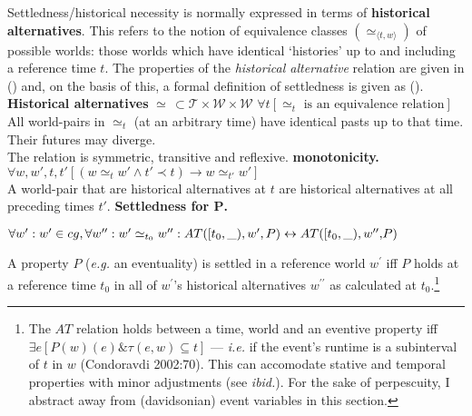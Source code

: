 \documentclass[11pt]{article}
\begin{document}
Settledness/historical necessity is normally expressed in terms of \textbf{historical alternatives}. This refers to the notion of equivalence classes $(\simeq_{\langle t,w\rangle})$ of possible worlds: those worlds which have identical `histories' up to and including a reference time $t$. The properties of the \textit{historical alternative} relation are given in (\nextx) and, on the basis of this, a formal definition of settledness is given as (\anextx).
\pex \textbf{Historical alternatives} $\boldsymbol\simeq\,\subset\mathcal{T\times W\times W}$
\a $\forall t[\simeq_t\text{ is an equivalence relation}]$\\
All world-pairs in $\simeq_t$ (at an arbitrary time) have identical pasts up to that time.\\Their futures may diverge.\\
The relation is symmetric, transitive and reflexive.
\a \textbf{monotonicity.} $ \forall w,w',t,t'[(w\simeq_t w'\wedge t'\prec t)\to w\simeq_{t'} w']$\\
A world-pair that are historical alternatives at $t$ are historical alternatives at all preceding times $t'$.
\xe
\ex \textbf{Settledness for $\boldsymbol P$.}


$\forall w^\prime:w^\prime\in cg,\forall w^{\prime\prime}:w^\prime\simeq_{t_0}w^{\prime\prime}:\\AT([t_0,\_),w^\prime, P)\leftrightarrow AT([t_0,\_),w^{\prime\prime},\!P)$\hspace*{\fill}\citep[82]{Condoravdi2002}\vspace{.25cm}


A property $P$ (\textit{e.g.} an eventuality) is settled in a reference world $w^\prime$ iff $P$ holds at a reference time $t_0$ in all of $w^\prime$'s historical alternatives $w^{\prime\prime}$ as calculated at $t_0$.\footnote{The $AT$ relation holds between a time, world and an eventive property iff $\exists e[P(w)(e)\&\tau(e,w)\subseteq t]$ --- \textit{i.e.} if the event's runtime is a subinterval of $t$ in $w$ (Condoravdi 2002:70). This can accomodate stative and temporal properties with minor adjustments (see \textit{ibid.}). For the sake of perpescuity, I abstract away from (davidsonian) event variables in this section.}

\xe
\end{document}
